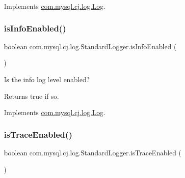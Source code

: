 Implements \mbox{\hyperlink{interfacecom_1_1mysql_1_1cj_1_1log_1_1_log_a61464d2603e609442da19c59c5c62f62}{com.\+mysql.\+cj.\+log.\+Log}}.

\mbox{\label{classcom_1_1mysql_1_1cj_1_1log_1_1_standard_logger_afa3c624bf9920c0131a8d0581c571ef8}} 
\subsubsection{\texorpdfstring{is\+Info\+Enabled()}{isInfoEnabled()}}
{\footnotesize\ttfamily boolean com.\+mysql.\+cj.\+log.\+Standard\+Logger.\+is\+Info\+Enabled (\begin{DoxyParamCaption}{ }\end{DoxyParamCaption})}

Is the \textquotesingle{}info\textquotesingle{} log level enabled?

\begin{DoxyReturn}{Returns}
true if so. 
\end{DoxyReturn}


Implements \mbox{\hyperlink{interfacecom_1_1mysql_1_1cj_1_1log_1_1_log_aecb7f781b61b516d6bad9ada8e7dd3aa}{com.\+mysql.\+cj.\+log.\+Log}}.

\mbox{\label{classcom_1_1mysql_1_1cj_1_1log_1_1_standard_logger_afb271f7134e427754d35ae250b222f9e}} 
\subsubsection{\texorpdfstring{is\+Trace\+Enabled()}{isTraceEnabled()}}
{\footnotesize\ttfamily boolean com.\+mysql.\+cj.\+log.\+Standard\+Logger.\+is\+Trace\+Enabled (\begin{DoxyParamCaption}{ }\end{DoxyParamCaption})}

